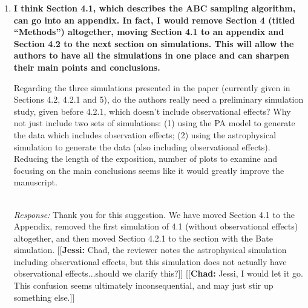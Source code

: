 \documentclass[11pt, oneside]{article}   	%
\newcommand{\jessi}[1]{{\color{blue}[[\textbf{Jessi: }#1]]}}
\newcommand{\chad}[1]{{\color{cyan}[[\textbf{Chad: }#1]]}}
\begin{document}
\begin{enumerate}
\item {\bf I think Section 4.1, which describes the ABC sampling algorithm, can go into an appendix. In fact, I would remove Section 4 (titled ``Methods'') altogether, moving Section 4.1 to an appendix and Section 4.2 to the next section on simulations. This will allow the authors to have all the simulations in one place and can sharpen their main points and conclusions.

Regarding the three simulations presented in the paper (currently given in Sections 4.2, 4.2.1 and 5), do the authors really need a preliminary simulation study, given before 4.2.1, which doesn't include observational effects? Why not just include two sets of simulations: (1) using the PA model to generate the data which includes observation effects; (2) using the astrophysical simulation to generate the data (also including observational effects). Reducing the length of the exposition, number of plots to examine and focusing on the main conclusions seems like it would greatly improve the manuscript.
}\\
\noindent \emph{Response:} Thank you for this suggestion.  We have moved Section 4.1 to the Appendix, removed the first simulation of 4.1 (without observational effects) altogether, and then moved Section 4.2.1 to the section with the Bate simulation.  
\jessi{Chad, the reviewer notes the astrophysical simulation including observational effects, but this simulation does not actually have observational effects...should we clarify this?}
\chad{Jessi, I would let it go. This confusion seems ultimately inconsequential, and may just stir up something else.}
\bigskip
\end{enumerate}
\end{document}
